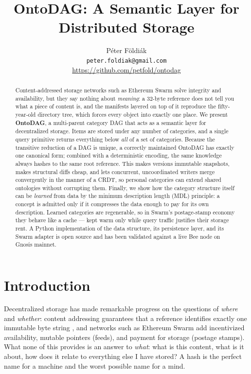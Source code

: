 \documentclass[10pt,twocolumn]{article}
\title{\textbf{OntoDAG: A Semantic Layer for Distributed Storage}}
\author{P\'eter F\"oldi\'ak\\
\small\texttt{peter.foldiak@gmail.com}\\
\small\url{https://github.com/petfold/ontodag}}
\date{}
\begin{document}
\maketitle

\begin{abstract}
Content-addressed storage networks such as Ethereum Swarm solve integrity
and availability, but they say nothing about \emph{meaning}: a 32-byte
reference does not tell you what a piece of content is, and the manifests
layered on top of it reproduce the fifty-year-old directory tree, which
forces every object into exactly one place. We present \textbf{OntoDAG}, a
multi-parent category DAG that acts as a semantic layer for decentralized
storage. Items are stored under any number of categories, and a single
query primitive returns everything below \emph{all} of a set of categories.
Because the transitive reduction of a DAG is unique, a correctly maintained
OntoDAG has exactly one canonical form; combined with a deterministic
encoding, the same knowledge always hashes to the same root reference.
This makes versions immutable snapshots, makes structural diffs cheap, and
lets concurrent, uncoordinated writers merge convergently in the manner of
a CRDT, so personal categories can extend shared ontologies without
corrupting them. Finally, we show how the category structure itself can be
\emph{learned} from data by the minimum description length (MDL) principle:
a concept is admitted only if it compresses the data enough to pay for its
own description. Learned categories are regenerable, so in Swarm's
postage-stamp economy they behave like a cache --- kept warm only while
query traffic justifies their storage rent. A Python implementation of the
data structure, its persistence layer, and its Swarm adapter is open
source and has been validated against a live Bee node on Gnosis mainnet.
\end{abstract}

\section{Introduction}

Decentralized storage has made remarkable progress on the questions of
\emph{where} and \emph{whether}: content addressing guarantees that a
reference identifies exactly one immutable byte string
\cite{merkle1987,benet2014}, and networks such as Ethereum Swarm
\cite{tron2020} add incentivized availability, mutable pointers (feeds),
and payment for storage (postage stamps). What none of this provides is an
answer to \emph{what}: what is this content, what is it about, how does it
relate to everything else I have stored? A hash is the perfect name for a
machine and the worst possible name for a mind.
\end{document}
